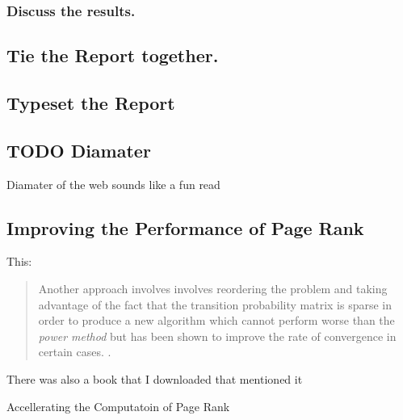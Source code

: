 \documentclass[11pt]{article}
\begin{document}
\subsubsection{Discuss the results.}
\label{sec:orgd3fd2dd}
\subsection{Tie the Report together.}
\label{sec:org10f5b1d}
\subsection{Typeset the Report}
\label{sec:orgf11c080}

\subsection{TODO Diamater}
\label{sec:orgdc860c9}
Diamater of the web sounds like a fun read \cite{albertDiameterWorldWideWeb1999}
\subsection{Improving the Performance of Page Rank}
\label{sec:orgd337bf5}

This:

\begin{quote}
Another approach involves involves reordering the problem and taking advantage
of the fact that the transition probability matrix is sparse  in order
to produce a new algorithm which cannot perform worse than the \emph{power method}
but has been shown to improve the rate of convergence in certain cases.
\cite{langvilleReorderingPageRankProblem2006}.
\end{quote}


There was also a book that I downloaded that mentioned it

Accellerating the Computatoin of Page Rank \cite{langvilleGooglePageRankScience2012}
\end{document}

